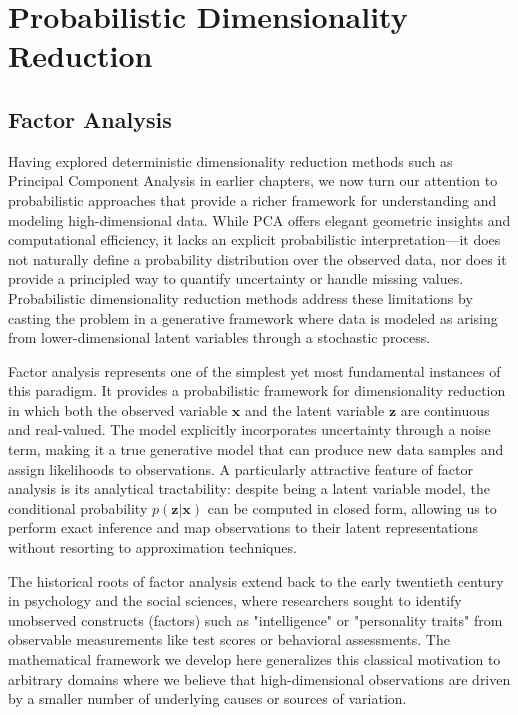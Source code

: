 
\chapter{Probabilistic Dimensionality Reduction}

\section*{Factor Analysis}\label{section_factor_analysis}

Having explored deterministic dimensionality reduction methods such as Principal Component Analysis in earlier chapters, we now turn our attention to probabilistic approaches that provide a richer framework for understanding and modeling high-dimensional data. While PCA offers elegant geometric insights and computational efficiency, it lacks an explicit probabilistic interpretation—it does not naturally define a probability distribution over the observed data, nor does it provide a principled way to quantify uncertainty or handle missing values. Probabilistic dimensionality reduction methods address these limitations by casting the problem in a generative framework where data is modeled as arising from lower-dimensional latent variables through a stochastic process.

Factor analysis represents one of the simplest yet most fundamental instances of this paradigm. It provides a probabilistic framework for dimensionality reduction in which both the observed variable $\mathbf{x}$ and the latent variable $\mathbf{z}$ are continuous and real-valued. The model explicitly incorporates uncertainty through a noise term, making it a true generative model that can produce new data samples and assign likelihoods to observations. A particularly attractive feature of factor analysis is its analytical tractability: despite being a latent variable model, the conditional probability $p(\mathbf{z}|\mathbf{x})$ can be computed in closed form, allowing us to perform exact inference and map observations to their latent representations without resorting to approximation techniques.

The historical roots of factor analysis extend back to the early twentieth century in psychology and the social sciences, where researchers sought to identify unobserved constructs (factors) such as "intelligence" or "personality traits" from observable measurements like test scores or behavioral assessments. The mathematical framework we develop here generalizes this classical motivation to arbitrary domains where we believe that high-dimensional observations are driven by a smaller number of underlying causes or sources of variation.


